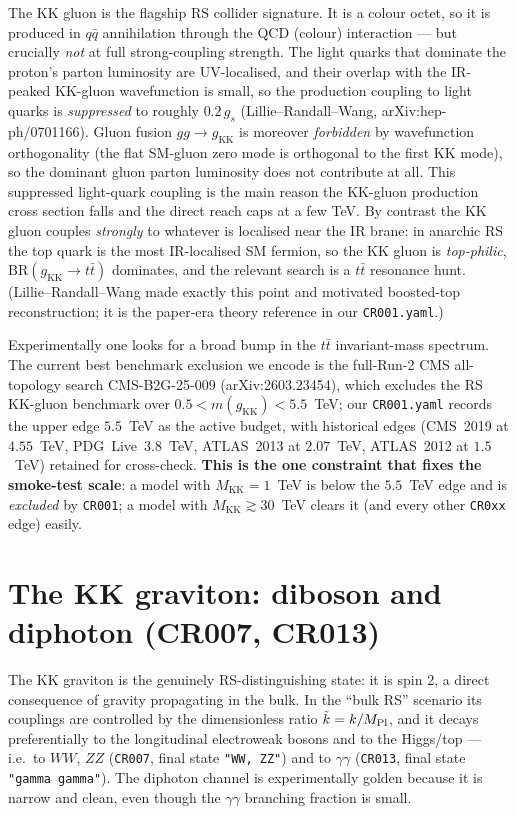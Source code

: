 \documentclass[11pt]{article}
\newcommand{\MKK}{M_{\mathrm{KK}}}
\newcommand{\gKK}{g_{\mathrm{KK}}}
\newcommand{\code}[1]{\texttt{#1}}
\theoremstyle{definition}
\begin{document}
The KK gluon is the flagship RS collider signature. It is a colour octet, so it
is produced in $q\bar q$ annihilation through the QCD (colour) interaction --- but
crucially \emph{not} at full strong-coupling strength. The light quarks that
dominate the proton's parton luminosity are UV-localised, and their overlap with
the IR-peaked KK-gluon wavefunction is small, so the production coupling to light
quarks is \emph{suppressed} to roughly $0.2\,g_s$ (Lillie--Randall--Wang,
arXiv:hep-ph/0701166). Gluon fusion $gg\to\gKK$ is moreover \emph{forbidden} by
wavefunction orthogonality (the flat SM-gluon zero mode is orthogonal to the
first KK mode), so the dominant gluon parton luminosity does not contribute at
all. This suppressed light-quark coupling is the main reason the KK-gluon
production cross section falls and the direct reach caps at a few TeV. By
contrast the KK gluon couples \emph{strongly} to whatever is localised near the
IR brane: in anarchic RS the top quark is the most IR-localised SM fermion, so
the KK gluon is \emph{top-philic}, $\mathrm{BR}(\gKK\to t\bar t)$ dominates, and
the relevant search is a $t\bar t$ resonance hunt. (Lillie--Randall--Wang made
exactly this point and motivated boosted-top reconstruction; it is the paper-era
theory reference in our \code{CR001.yaml}.)

Experimentally one looks for a broad bump in the $t\bar t$ invariant-mass
spectrum. The current best benchmark exclusion we encode is the full-Run-2 CMS
all-topology search \mbox{CMS-B2G-25-009} (arXiv:2603.23454), which excludes the
RS KK-gluon benchmark over $0.5 < m(\gKK) < 5.5$~TeV; our \code{CR001.yaml}
records the upper edge $5.5$~TeV as the active budget, with historical edges
(CMS~2019 at $4.55$~TeV, PDG~Live~$3.8$~TeV, ATLAS~2013 at $2.07$~TeV,
ATLAS~2012 at $1.5$~TeV) retained for cross-check. \textbf{This is the one
constraint that fixes the smoke-test scale}: a model with $\MKK = 1$~TeV is below
the $5.5$~TeV edge and is \emph{excluded} by \code{CR001}; a model with $\MKK
\gtrsim 30$~TeV clears it (and every other \code{CR0xx} edge) easily.

\section{The KK graviton: diboson and diphoton (CR007, CR013)}
\label{sec:graviton}

The KK graviton is the genuinely RS-distinguishing state: it is spin 2, a direct
consequence of gravity propagating in the bulk. In the ``bulk RS'' scenario its
couplings are controlled by the dimensionless ratio $\tilde k = k/M_{\rm Pl}$,
and it decays preferentially to the longitudinal electroweak bosons and to the
Higgs/top --- i.e.\ to $WW$, $ZZ$ (\code{CR007}, final state \code{"WW, ZZ"}) and
to $\gamma\gamma$ (\code{CR013}, final state \code{"gamma gamma"}). The diphoton
channel is experimentally golden because it is narrow and clean, even though the
$\gamma\gamma$ branching fraction is small.
\end{document}
